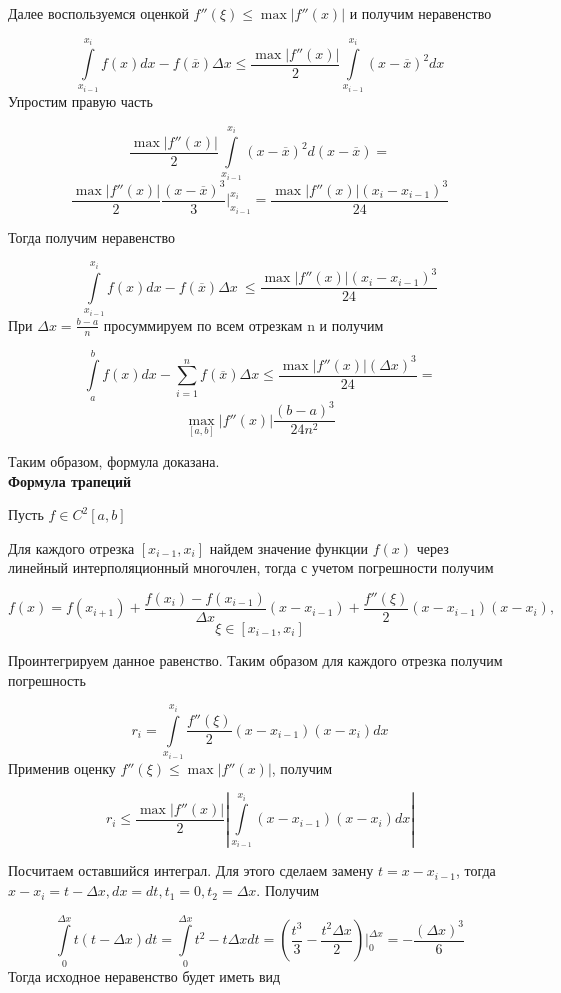 \documentclass{beamer}
\begin{document}
	Далее воспользуемся оценкой $f''(\xi) \leq \max|f''(x)|$ и получим неравенство
	
	\[ \int\limits_{x_{i-1}}^{x_i} f(x)dx - f(\overline{x}) \Delta x \leq \frac{\max|f''(x)|}{2} \int\limits_{x_{i-1}}^{x_i} (x - \overline{x})^2 dx\]
	\newpage
	Упростим правую часть
	
	\[ \frac{\max|f''(x)|}{2} \int\limits_{x_{i-1}}^{x_i} (x - \overline{x})^2 d(x - \overline{x}) = \]\[\frac{\max|f''(x)|}{2} \frac{(x - \overline{x})^3}{3} \Bigg|_{x_{i-1}}^{x_i} = \frac{\max|f''(x)|(x_i - x_{i-1})^3}{24}\]
	
	Тогда получим неравенство
	
	\[ \int\limits_{x_{i-1}}^{x_i} f(x)dx - f(\overline{x}) \Delta x\ \leq \frac{\max|f''(x)|(x_i - x_{i-1})^3}{24}\]
	\newpage
	При $\Delta x = \frac{b-a}{n}$ просуммируем по всем отрезкам n и получим
	
	\[ \int\limits_{a}^{b} f(x)dx - \sum_{i=1}^{n} f(\overline{x}) \Delta x \leq \frac{\max|f''(x)|(\Delta x)^3}{24} = \]\[\max_{[a, b]}|f''(x)| \frac{(b - a)^3}{24n^2} \]
	
	Таким образом, формула доказана. \\
	\newpage
	\textbf{Формула трапеций}
	
	Пусть $f \in C^2[a, b]$
	
	Для каждого отрезка $[x_{i-1}, x_i]$ найдем значение функции $f(x)$ через линейный интерполяционный многочлен, тогда с учетом погрешности получим
	
	\[ f(x) = f(x_{i+1}) + \frac{f(x_i) - f(x_{i-1})}{\Delta x} (x - x_{i-1}) + \frac{f''(\xi)}{2}(x - x_{i-1})(x-x_i), \]\[ \xi \in [x_{i-1}, x_i]\]
	
	Проинтегрируем данное равенство. Таким образом для каждого отрезка получим погрешность
	
	\[ r_i  = \int\limits_{x_{i-1}}^{x_i} \frac{f''(\xi)}{2}(x - x_{i-1})(x-x_i)dx\]
	\newpage
	Применив оценку $f''(\xi) \leq \max|f''(x)|$, получим
	
	\[ r_i \leq \frac{\max|f''(x)|}{2} \left| \int\limits_{x_{i-1}}^{x_i}(x - x_{i-1})(x-x_i)dx \right| \]
	
	Посчитаем оставшийся интеграл. Для этого сделаем замену $t = x - x_{i-1}$, тогда $x - x_i = t - \Delta x, dx = dt, t_1 = 0, t_2 = \Delta x$. Получим
	
	\[ \int\limits_{0}^{\Delta x} t(t-\Delta x) dt = \int\limits_{0}^{\Delta x} t^2-t\Delta x dt = \left( \frac{t^3}{3} - \frac{t^2 \Delta x}{2} \right) \Bigg|_{0}^{\Delta x} = - \frac{(\Delta x)^3}{6} \]
	\newpage
	Тогда исходное неравенство будет иметь вид
	
\end{document}
